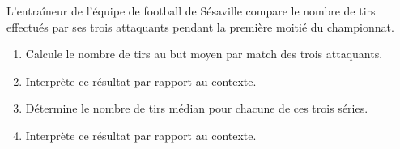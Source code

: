 %
%
    L'entraîneur de l'équipe de football de Sésaville compare le nombre de tirs effectués par ses
    trois attaquants pendant la première moitié du championnat.
    \begin{center}
        \pgfplotsset{width=.35\linewidth}
        
        
        
    \end{center}

    \begin{enumerate}
        \item Calcule le nombre de tirs au but moyen par match des trois attaquants.
        \item Interprète ce résultat par rapport au contexte.
        \item  Détermine le nombre de tirs médian pour chacune de ces trois séries.
        \item Interprète ce résultat par rapport au contexte.
    \end{enumerate}

